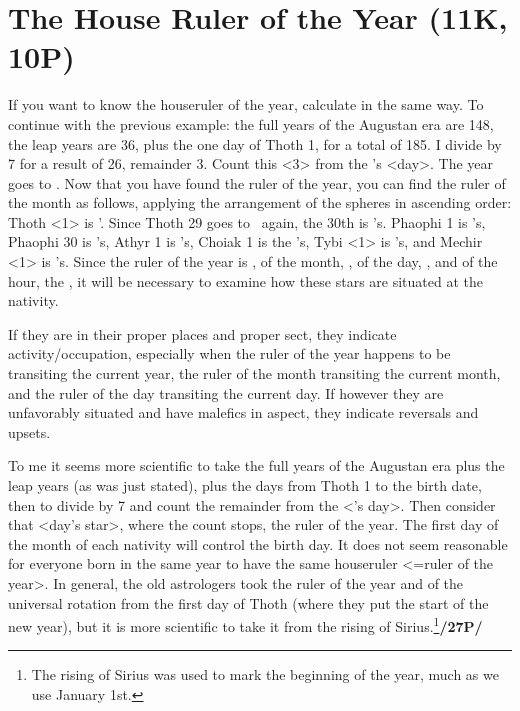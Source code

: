 \section{The House Ruler of the Year (11K, 10P)}
\mnm[0.3cm]
If you want to know the houseruler of the year, calculate in the same way. To continue with the previous example: the full years of the Augustan era are 148, the leap years are 36, plus the one day of Thoth 1, for a total of 185. I divide by 7 for a result of 26, remainder 3. Count this <3> from the \Sun’s
<day>. The year goes to \Mars. 
Now that you have found the ruler of the year, you can find the ruler of the month as follows, applying the arrangement of the spheres in ascending order: Thoth <1> is \Mars’. Since
Thoth 29 goes to \Mars\, again, the 30th is \Mercury’s. Phaophi 1 is \Jupiter’s, Phaophi 30 is \Venus’s, Athyr
1 is \Saturn’s, Choiak 1 is the \Moon’s, Tybi <1> is \Mercury’s, and Mechir <1> is \Venus’s. Since the
ruler of the year is \Mars, of the month, \Venus, of the day, \Mercury, and of the hour, the \Sun, it will be necessary to examine how these stars are situated at the nativity. 

\mndl[0.2cm]
If they are in their proper places and proper sect, they indicate activity/occupation, especially when the ruler of the year happens to be transiting the current year, the ruler of the month transiting the current month, and the ruler of the day transiting the current day. If however they are unfavorably situated and have malefics in aspect, they indicate reversals
and upsets.

To me it seems more scientific to take the full years of the Augustan era plus the leap years (as was just stated), plus the days from Thoth 1 to the birth date, then to divide by 7 and count the remainder from the \Sun<’s day>. Then consider that <day’s star>, where the count stops, the ruler of the year. The first day of the month of each nativity will control the birth day. It does not seem reasonable for everyone born in the same year to have the same houseruler <=ruler of the year>. In general, the old astrologers took the ruler of the year and of the universal rotation from the first day of Thoth (where they put the start of the new year), but it is more scientific to take it from the rising of Sirius.\footnote{The rising of Sirius was used to mark the beginning of the year, much as we use January 1st.}\textbf{/27P/}
\newpage